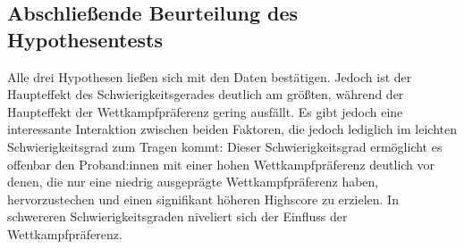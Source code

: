 \documentclass[
]{book}
\begin{document}
\hypertarget{abschlieuxdfende-beurteilung-des-hypothesentests}{%
\subsection{Abschließende Beurteilung des Hypothesentests}\label{abschlieuxdfende-beurteilung-des-hypothesentests}}

Alle drei Hypothesen ließen sich mit den Daten bestätigen. Jedoch ist der Haupteffekt des Schwierigkeitsgerades deutlich am größten, während der Haupteffekt der Wettkampfpräferenz gering ausfällt. Es gibt jedoch eine interessante Interaktion zwischen beiden Faktoren, die jedoch lediglich im leichten Schwierigkeitsgrad zum Tragen kommt: Dieser Schwierigkeitsgrad ermöglicht es offenbar den Proband:innen mit einer hohen Wettkampfpräferenz deutlich vor denen, die nur eine niedrig ausgeprägte Wettkampfpräferenz haben, hervorzustechen und einen signifikant höheren Highscore zu erzielen. In schwereren Schwierigkeitsgraden niveliert sich der Einfluss der Wettkampfpräferenz.

  
\end{document}
